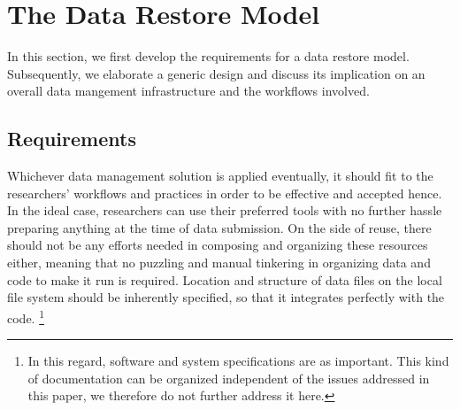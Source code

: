 \documentclass{acm_proc_article-sp}
\begin{document}
\section{The Data Restore Model}\label{sec:datareferencing}

In this section, we first develop the requirements for a data restore model.
Subsequently, we elaborate a generic design and discuss its implication on an overall data mangement infrastructure and the workflows involved.


\subsection{Requirements}

Whichever data management solution is applied eventually, it should fit to the researchers' workflows and practices in order to be effective and accepted hence.
\cite{Feijen_2011} 
In the ideal case, researchers can use their preferred tools with no further hassle preparing anything at the time of data submission.
%
On the side of reuse, there should not be any efforts needed in composing and organizing these resources either, meaning that no puzzling and manual tinkering in organizing data and code to make it run is required.
Location and structure of data files on the local file system should be inherently specified, so that it integrates perfectly with the code.
\footnote{In this regard, software and system specifications are as important. This kind of documentation can be organized independent of the issues addressed in this paper, we therefore do not further address it here.}
  
\end{document}
